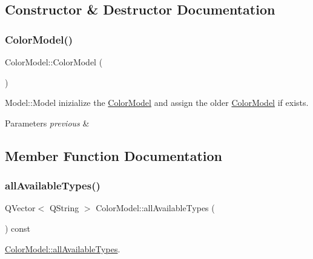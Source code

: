 \subsection{Constructor \& Destructor Documentation}
\mbox{\label{class_color_model_a2c2ee4adfbff8d5d5c9f7dc6fb7e9f3f}} 
\subsubsection{\texorpdfstring{Color\+Model()}{ColorModel()}}
{\footnotesize\ttfamily Color\+Model\+::\+Color\+Model (\begin{DoxyParamCaption}{ }\end{DoxyParamCaption})}



Model\+::\+Model inizialize the \hyperlink{class_color_model}{Color\+Model} and assign the older \hyperlink{class_color_model}{Color\+Model} if exists. 


\begin{DoxyParams}{Parameters}
{\em previous} & \\
\hline
\end{DoxyParams}


\subsection{Member Function Documentation}
\mbox{\label{class_color_model_ac1788de4bf589070a2e915ff43d073ad}} 
\subsubsection{\texorpdfstring{all\+Available\+Types()}{allAvailableTypes()}}
{\footnotesize\ttfamily Q\+Vector$<$ Q\+String $>$ Color\+Model\+::all\+Available\+Types (\begin{DoxyParamCaption}{ }\end{DoxyParamCaption}) const\hspace{0.3cm}{\ttfamily [virtual]}}



\hyperlink{class_color_model_ac1788de4bf589070a2e915ff43d073ad}{Color\+Model\+::all\+Available\+Types}. 

